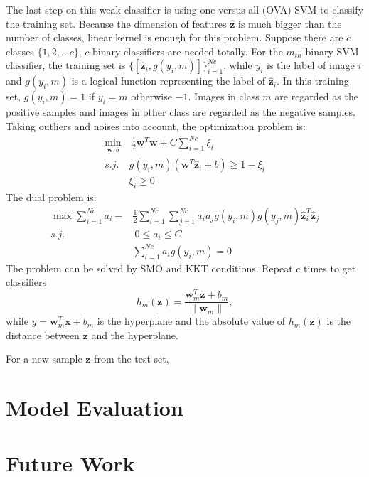 \documentclass[conference]{IEEEtran}
\begin{document}
The last step on this weak classifier is using one-versus-all (OVA) SVM\cite{ova} to classify the training set. Because the dimension of features $\hat{\mathbf{z}}$ is much bigger than the number of classes, linear kernel is enough for this problem. Suppose there are $c$ classes $\{1,2,\dots c\}$, $c$ binary classifiers are needed totally. For the $m_{th}$ binary SVM classifier, the training set is $\{[\hat{\mathbf{z}}_i, g(y_i,m)]\}_{i=1}^{Nc}$, while $y_i$ is the label of image $i$ and $g(y_i , m)$ is a logical function representing the label of $\hat{\mathbf{z}}_i$. In this training set, $g(y_i,m)=1$ if $y_i = m$ otherwise $-1$.  Images in class $m$ are regarded as the positive samples and images in other class are regarded as the negative samples. Taking outliers and noises into account, the optimization problem is:
\begin{align}
	\min_{\mathbf{w},b} &\ \frac{1}{2}\mathbf{w}^T\mathbf{w} + C \sum\limits_{i=1}^{Nc}\xi_i\\
	s.j.\ & g(y_i , m)(\mathbf{w}^T\hat{\mathbf{z}}_i+b)\geq 1-\xi_i\\
	& \xi_i\geq 0
\end{align}
The dual problem is:
\begin{align}
	\max  \sum\limits_{i=1}^{Nc}a_i - &\frac{1}{2}\sum\limits_{i=1}^{Nc}\sum\limits_{j=1}^{Nc}a_ia_jg(y_i , m)g(y_j,m)\hat{\mathbf{z}}_i^T\hat{\mathbf{z}}_j\\
	 s.j. &\ 0\leq	a_i\leq C\\
	 & \sum\limits_{i=1}^{Nc}a_ig(y_i, m) = 0
\end{align}
The problem can be solved by SMO and KKT conditions. Repeat $c$ times to get classifiers 
\begin{equation}
	h_m(\mathbf{z}) = \frac{\mathbf{w}_m^T\mathbf{z}+b_m}{\|\mathbf{w}_m\|},
\end{equation}
while $y = \mathbf{w}_m^T\mathbf{x}+b_m$ is the hyperplane and the absolute value of $h_m(\mathbf{z})$ is the distance between $\mathbf{z}$ and the hyperplane.

For a new sample $\mathbf{z}$ from the test set, 

 


\section{Model Evaluation}

\section{Future Work}
\end{document}
